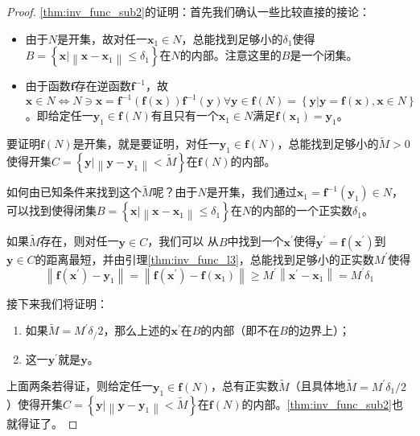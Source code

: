 \documentclass[main.tex]{subfiles}
\begin{document}
\begin{proof}
\ref{thm:inv_func_sub2}的证明：首先我们确认一些比较直接的接论：
\begin{itemize}
    \item 由于$N$是开集，故对任一$\mathbf{x}_1\in N$，总能找到足够小的$\delta_1$使得$B=\left\{\mathbf{x}|\left\|\mathbf{x}-\mathbf{x}_1\right\|\leq\delta_1\right\}$在$N$的内部。注意这里的$B$是一个闭集。
    \item 由于函数$\mathbf{f}$存在逆函数$\mathbf{f}^{-1}$，故$\mathbf{x}\in N\Leftrightarrow N\ni \mathbf{x}= \mathbf{f}^{-1}\left(\mathbf{f}\left(\mathbf{x}\right)\right)\mathbf{f}^{-1}\left(\mathbf{y}\right)\forall \mathbf{y}\in\mathbf{f}\left(N\right)=\left\{\mathbf{y}|\mathbf{y}=\mathbf{f}\left(\mathbf{x}\right),\mathbf{x}\in N\right\}$。即给定任一$\mathbf{y}_1\in\mathbf{f}\left(N\right)$有且只有一个$\mathbf{x}_1\in N$满足$\mathbf{f}\left(\mathbf{x}_1\right)=\mathbf{y}_1$。
\end{itemize}

要证明$\mathbf{f}\left(N\right)$是开集，就是要证明，对任一$\mathbf{y}_1\in\mathbf{f}\left(N\right)$，总能找到足够小的$\widetilde{M}>0$使得开集$C=\left\{\mathbf{y}|\left\|\mathbf{y}-\mathbf{y}_1\right\|<\widetilde{M}\right\}$在$\mathbf{f}\left(N\right)$的内部。

如何由已知条件来找到这个$\widetilde{M}$呢？由于$N$是开集，我们通过$\mathbf{x}_1=\mathbf{f}^{-1}\left(\mathbf{y}_1\right)\in N$，可以找到使得闭集$B=\left\{\mathbf{x}|\left\|\mathbf{x}-\mathbf{x}_1\right\|\leq\delta_1\right\}$在$N$的内部的一个正实数$\delta_1$。

如果$\widetilde{M}$存在，则对任一$\mathbf{y}\in C$，我们可以
从$B$中找到一个$\mathbf{x}^\prime$使得$\mathbf{y}^\prime=\mathbf{f}\left(\mathbf{x}^\prime\right)$到$\mathbf{y}\in C$的距离最短，并由引理\ref{thm:inv_func_l3}，总能找到足够小的正实数$M^\prime$使得
\[\left\|\mathbf{f}\left(\mathbf{x}^\prime\right)-\mathbf{y}_1\right\|=\left\|\mathbf{f}\left(\mathbf{x}^\prime\right)-\mathbf{f}\left(\mathbf{x}_1\right)\right\|\geq M^\prime\left\|\mathbf{x}^\prime-\mathbf{x}_1\right\|=M^\prime\delta_1
\]

接下来我们将证明：
\begin{enumerate}[label=\roman*]
\item\label{thm:inv_func_sub2_sub1} 如果$\widetilde{M}=M^\prime\delta_/2$，那么上述的$\mathbf{x}^\prime$在$B$的内部（即不在$B$的边界上）；
\item\label{thm:inv_func_sub2_sub2} 这一$\mathbf{y}^\prime$就是$\mathbf{y}$。
\end{enumerate}
上面两条若得证，则给定任一$\mathbf{y}_1\in\mathbf{f}\left(N\right)$，总有正实数$\widetilde{M}$（且具体地$\widetilde{M}=M^\prime\delta_1/2$）使得开集$C=\left\{\mathbf{y}|\left\|\mathbf{y}-\mathbf{y}_1\right\|<\widetilde{M}\right\}$在$\mathbf{f}\left(N\right)$的内部。\ref{thm:inv_func_sub2}也就得证了。


\end{proof}
\end{document}
